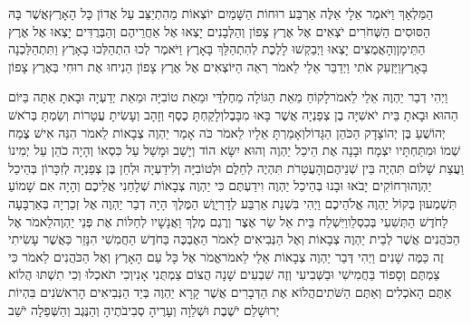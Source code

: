 \documentclass[../main/main.tex]{subfiles}
\begin{document}
\begin{multicols}{\ncols}
הַמַּלְאָךְ וַיֹּאמֶר אֵלָי אֵלֶּה אַרְבַּע רוּחוֹת הַשָּׁמַיִם יוֹצְאוֹת מֵהִתְיַצֵּב עַל אֲדוֹן כָּל הָאָרֶץ\PreVerseSpace{}אֲשֶׁר בָּהּ הַסּוּסִים הַשְּׁחֹרִים יֹצְאִים אֶל אֶרֶץ צָפוֹן וְהַלְּבָנִים יָצְאוּ אֶל אַחֲרֵיהֶם וְהַבְּרֻדִּים יָצְאוּ אֶל אֶרֶץ הַתֵּימָן\PreVerseSpace{}וְהָאֲמֻצִּים יָצְאוּ וַיְבַקְשׁוּ לָלֶכֶת לְהִתְהַלֵּךְ בָּאָרֶץ וַיֹּאמֶר לְכוּ הִתְהַלְּכוּ בָאָרֶץ וַתִּתְהַלַּכְנָה בָּאָרֶץ\PreVerseSpace{}וַיַּזְעֵק אֹתִי וַיְדַבֵּר אֵלַי לֵאמֹר רְאֵה הַיּוֹצְאִים אֶל אֶרֶץ צָפוֹן הֵנִיחוּ אֶת רוּחִי בְּאֶרֶץ צָפוֹן\OpenSection{}\par
{}וַיְהִי דְבַר יַהְוֶה אֵלַי לֵאמֹר\PreVerseSpace{}לָקוֹחַ מֵאֵת הַגּוֹלָה מֵחֶלְדַּי וּמֵאֵת טוֹבִיָּה וּמֵאֵת יְדַעְיָה וּבָאתָ אַתָּה בַּיּוֹם הַהוּא וּבָאתָ בֵּית יֹאשִׁיָּה בֶן צְפַנְיָה אֲשֶׁר בָּאוּ מִבָּבֶל\PreVerseSpace{}וְלָקַחְתָּ כֶסֶף וְזָהָב וְעָשִׂיתָ עֲטָרוֹת וְשַׂמְתָּ בְּרֹאשׁ יְהוֹשֻׁעַ בֶּן יְהוֹצָדָק הַכֹּהֵן הַגָּדוֹל\PreVerseSpace{}וְאָמַרְתָּ אֵלָיו לֵאמֹר כֹּה אָמַר יַהְוֶה צְבָאוֹת לֵאמֹר הִנֵּה אִישׁ צֶמַח שְׁמוֹ וּמִתַּחְתָּיו יִצְמָח וּבָנָה אֶת הֵיכַל יַהְוֶה\PreVerseSpace{} וְהוּא יִשָּׂא הוֹד וְיָשַׁב וּמָשַׁל עַל כִּסְאוֹ וְהָיָה כֹהֵן עַל יְמִינוֹ\SubEnd{} וַעֲצַת שָׁלוֹם תִּהְיֶה בֵּין שְׁנֵיהֶם\PreVerseSpace{}וְהָעֲטָרֹת תִּהְיֶה לְחֵלֶם וּלְטוֹבִיָּה וְלִידַעְיָה וּלְחֵן בֶּן צְפַנְיָה לְזִכָּרוֹן בְּהֵיכַל יַהְוֶה\PreVerseSpace{}וּרְחוֹקִים יָבֹאוּ וּבָנוּ בְּהֵיכַל יַהְוֶה וִידַעְתֶּם כִּי יַהְוֶה צְבָאוֹת שְׁלָחַנִי אֲלֵיכֶם וְהָיָה אִם שָׁמוֹעַ תִּשְׁמְעוּן בְּקוֹל יַהְוֶה אֱלֹהֵיכֶם \ClosedSection{}וַיְהִי בִּשְׁנַת אַרְבַּע לְדָרְיָוֶשׁ הַמֶּלֶךְ הָיָה דְבַר יַהְוֶה אֶל זְכַרְיָה בְּאַרְבָּעָה לַחֹדֶשׁ הַתְּשִׁעִי בְּכִסְלֵו\PreVerseSpace{}וַיִּשְׁלַח בֵּית אֵל שַׂר אֶצֶר וְרֶגֶם מֶלֶךְ וַאֲנָשָׁיו לְחַלּוֹת אֶת פְּנֵי יַהְוֶה\PreVerseSpace{}לֵאמֹר אֶל הַכֹּהֲנִים אֲשֶׁר לְבֵית יַהְוֶה צְבָאוֹת וְאֶל הַנְּבִיאִים לֵאמֹר הַאֶבְכֶּה בַּחֹדֶשׁ הַחֲמִשִׁי הִנָּזֵר כַּאֲשֶׁר עָשִׂיתִי זֶה כַּמֶּה שָׁנִים \ClosedSection{}וַיְהִי דְּבַר יַהְוֶה צְבָאוֹת אֵלַי לֵאמֹר\PreVerseSpace{}אֱמֹר אֶל כָּל עַם הָאָרֶץ וְאֶל הַכֹּהֲנִים לֵאמֹר כִּי צַמְתֶּם וְסָפוֹד בַּחֲמִישִׁי וּבַשְּׁבִיעִי וְזֶה שִׁבְעִים שָׁנָה הֲצוֹם צַמְתֻּנִי אָנִי\PreVerseSpace{}וְכִי תֹאכְלוּ וְכִי תִשְׁתּוּ הֲלוֹא אַתֶּם הָאֹכְלִים וְאַתֶּם הַשֹּׁתִים\PreVerseSpace{}הֲלוֹא אֶת הַדְּבָרִים אֲשֶׁר קָרָא יַהְוֶה בְּיַד הַנְּבִיאִים הָרִאשֹׁנִים בִּהְיוֹת יְרוּשָׁלֵם יֹשֶׁבֶת וּשְׁלֵוָה וְעָרֶיהָ סְבִיבֹתֶיהָ וְהַנֶּגֶב וְהַשְּׁפֵלָה יֹשֵׁב\OpenSection{}\par

\end{multicols}
\end{document}

